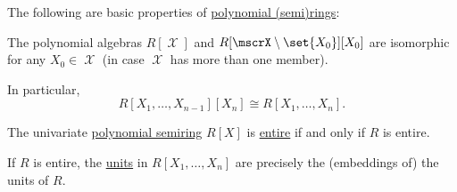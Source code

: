 \begin{proposition}\label{thm:def:polynomial_semiring/properties}
  The following are basic properties of \hyperref[def:polynomial_semiring]{polynomial (semi)rings}:
  \begin{thmenum}
     The polynomial algebras \( R[\mscrX] \) and \( R[\mscrX \setminus \set{ X_0 }][X_0] \) are isomorphic for any \( X_0 \in \mscrX \) (in case \( \mscrX \) has more than one member).

    In particular,
    \begin{equation*}
      R[X_1, \ldots, X_{n-1}][X_n] \cong R[X_1, \ldots, X_n].
    \end{equation*}

     The univariate \hyperref[def:polynomial_semiring]{polynomial semiring} \( R[X] \) is \hyperref[def:divisibility/zero]{entire} if and only if \( R \) is entire.

     If \( R \) is entire, the \hyperref[def:divisibility/unit]{units} in \( R[X_1, \ldots, X_n] \) are precisely the (embeddings of) the units of \( R \).
  \end{thmenum}
\end{proposition}
